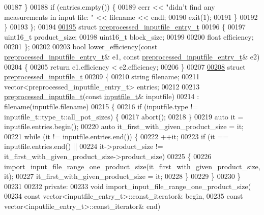 \begin{DoxyCode}
{{00187     \}
00188     \textcolor{keywordflow}{if} (entries.empty()) \{
00189       cerr << \textcolor{stringliteral}{"didn't find any measurements in input file: "} << filename << endl;
00190       exit(1);
00191     \}
00192   \}
00193 \};
00194 
\hyperlink{structpreprocessed__inputfile__entry__t}{00195} \textcolor{keyword}{struct }\hyperlink{structpreprocessed__inputfile__entry__t}{preprocessed\_inputfile\_entry\_t}
00196 \{
00197   uint16\_t product\_size;
00198   uint16\_t block\_size;
00199 
00200   \textcolor{keywordtype}{float} efficiency;
00201 \};
00202 
00203 \textcolor{keywordtype}{bool} lower\_efficiency(\textcolor{keyword}{const} \hyperlink{structpreprocessed__inputfile__entry__t}{preprocessed\_inputfile\_entry\_t}& e1, \textcolor{keyword}{const} 
      \hyperlink{structpreprocessed__inputfile__entry__t}{preprocessed\_inputfile\_entry\_t}& e2)
00204 \{
00205   \textcolor{keywordflow}{return} e1.efficiency < e2.efficiency;
00206 \}
00207 
\hyperlink{structpreprocessed__inputfile__t}{00208} \textcolor{keyword}{struct }\hyperlink{structpreprocessed__inputfile__t}{preprocessed\_inputfile\_t}
00209 \{
00210   \textcolor{keywordtype}{string} filename;
00211   vector<preprocessed\_inputfile\_entry\_t> entries;
00212 
00213   \hyperlink{structpreprocessed__inputfile__t}{preprocessed\_inputfile\_t}(\textcolor{keyword}{const} \hyperlink{structinputfile__t}{inputfile\_t}& inputfile)
00214     : filename(inputfile.filename)
00215   \{
00216     \textcolor{keywordflow}{if} (inputfile.type != inputfile\_t::type\_t::all\_pot\_sizes) \{
00217       abort();
00218     \}
00219     \textcolor{keyword}{auto} it = inputfile.entries.begin();
00220     \textcolor{keyword}{auto} it\_first\_with\_given\_product\_size = it;
00221     \textcolor{keywordflow}{while} (it != inputfile.entries.end()) \{
00222       ++it;
00223       \textcolor{keywordflow}{if} (it == inputfile.entries.end() ||
00224         it->product\_size != it\_first\_with\_given\_product\_size->product\_size)
00225       \{
00226         import\_input\_file\_range\_one\_product\_size(it\_first\_with\_given\_product\_size, it);
00227         it\_first\_with\_given\_product\_size = it;
00228       \}
00229     \}
00230   \}
00231 
00232 \textcolor{keyword}{private}:
00233   \textcolor{keywordtype}{void} import\_input\_file\_range\_one\_product\_size(
00234     \textcolor{keyword}{const} vector<inputfile\_entry\_t>::const\_iterator& begin,
00235     \textcolor{keyword}{const} vector<inputfile\_entry\_t>::const\_iterator& end)
}}
\end{DoxyCode}
